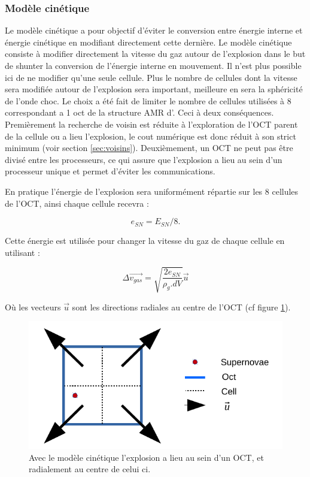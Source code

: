 \subsubsection{Modèle cinétique}

Le modèle cinétique a pour objectif d'éviter le conversion entre énergie interne et énergie cinétique en modifiant directement cette dernière.
Le modèle cinétique consiste à modifier directement la vitesse du gaz autour de l'explosion dans le but de shunter la conversion de l'énergie interne en mouvement.
Il n'est plus possible ici de ne modifier qu'une seule cellule.
Plus le nombre de cellules dont la vitesse sera modifiée autour de l'explosion sera important, meilleure en sera la sphéricité de l'onde choc.
Le choix a été fait de limiter le nombre de cellules utilisées à 8 correspondant a 1 oct de la structure \ac{AMR} d'\emma .
Ceci à deux conséquences.
Premièrement la recherche de voisin est réduite à l'exploration de l'OCT parent de la cellule ou a lieu l'explosion, le cout numérique est donc réduit à son strict minimum (voir section \ref{sec:voisins}).
Deuxièmement, un OCT ne peut pas être divisé entre les processeurs, ce qui assure que l'explosion a lieu au sein d'un processeur unique et permet d'éviter les communications.

En pratique l'énergie de l'explosion sera uniformément répartie sur les 8 cellules de l'OCT, ainsi chaque cellule recevra : 

\begin{equation}
e_{SN} = E_{SN}/8.
\end{equation}

Cette énergie est utilisée pour changer la vitesse du gaz de chaque cellule en utilisant : 

\begin{equation}
    \Delta \overrightarrow{v_{gas}} = \sqrt{\frac{2e_{SN}}{\rho_g.dV}} \overrightarrow{u}
    \label{eq_sn_direct}
\end{equation}

Où les vecteurs $\overrightarrow{u}$ sont les directions radiales au centre de l'OCT (cf figure \ref{fig:kin}).

\begin{figure}
        \includegraphics[width=.95\linewidth]{img/03/oct_kinetic.pdf} 
        \caption[Injection d'énergie cinétique]{Avec le modèle cinétique l'explosion a lieu au sein d'un OCT, et radialement au centre de celui ci.
 		\label{fig:kin}}
\end{figure}


